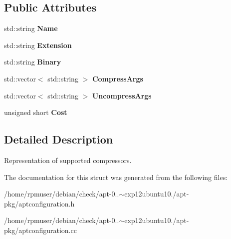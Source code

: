 \subsection*{\-Public \-Attributes}
\begin{DoxyCompactItemize}
\item 
std\-::string {\bfseries \-Name}\label{structAPT_1_1Configuration_1_1Compressor_adc852f586959ce13117d737cf3f14899}

\item 
std\-::string {\bfseries \-Extension}\label{structAPT_1_1Configuration_1_1Compressor_a0e4851f09e729e9592dce8484cc79536}

\item 
std\-::string {\bfseries \-Binary}\label{structAPT_1_1Configuration_1_1Compressor_a5f89ad96e23c260ea7a0d62890ab980b}

\item 
std\-::vector$<$ std\-::string $>$ {\bfseries \-Compress\-Args}\label{structAPT_1_1Configuration_1_1Compressor_a438d304f1749b3ad0dd6a3abbda5c50b}

\item 
std\-::vector$<$ std\-::string $>$ {\bfseries \-Uncompress\-Args}\label{structAPT_1_1Configuration_1_1Compressor_a767a69aef748a23650f5b7e12f11d586}

\item 
unsigned short {\bfseries \-Cost}\label{structAPT_1_1Configuration_1_1Compressor_a395eb05e88a9a042e1de085feeada458}

\end{DoxyCompactItemize}


\subsection{\-Detailed \-Description}
\-Representation of supported compressors. 

\-The documentation for this struct was generated from the following files\-:\begin{DoxyCompactItemize}
\item 
/home/rpmuser/debian/check/apt-\/0..$\sim$exp12ubuntu10./apt-\/pkg/aptconfiguration.\-h\item 
/home/rpmuser/debian/check/apt-\/0..$\sim$exp12ubuntu10./apt-\/pkg/aptconfiguration.\-cc\end{DoxyCompactItemize}

